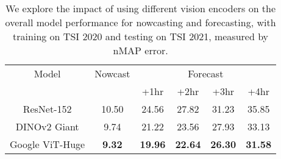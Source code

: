 \begin{table}[h]
  \caption{We explore the impact of using different vision encoders on the overall model performance for nowcasting and forecasting, with training on TSI 2020 and testing on TSI 2021, measured by nMAP error.}
  \label{tab:encoders_ablation}
  \centering
  \begin{tabular}{cccccc}
    \toprule
    Model & \multicolumn{1}{c}{Nowcast} & \multicolumn{4}{c}{Forecast} \\
    \cmidrule(lr){3-6}
    & &  +1hr & +2hr & +3hr & +4hr \\
    \midrule
    ResNet-152 & 10.50 & 24.56 & 27.82 & 31.23 & 35.85 \\
    DINOv2 Giant & 9.74 & 21.22 & 23.56 & 27.93 & 33.13 \\
    Google ViT-Huge & \textbf{9.32} & \textbf{19.96} & \textbf{22.64} & \textbf{26.30} & \textbf{31.58} \\
    \bottomrule
  \end{tabular}
\end{table}

